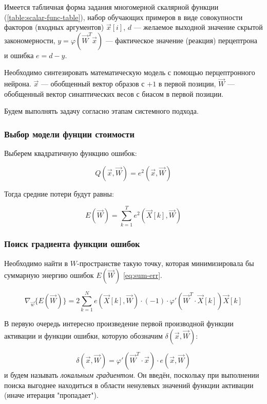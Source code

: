 \documentclass{article}
\numberwithin{equation}{subsection}
\begin{document}
Имеется табличная форма задания многомерной скалярной функции (\ref{table:scalar-func-table}), 
набор обучающих примеров в виде совокупности факторов (входных аргументов) $\vec{x}[i]$, $d$ ---
желаемое выходной значение скрытой закономерности, $y = \varphi (\vec{W}^T \vec{x})$ ---
фактическое значение (реакция) перцептрона и ошибка $e = d - y$.

Необходимо синтезировать математическую модель с помощью перцептронного нейрона. 
$\vec{x}$ --- обобщенный вектор образов с $+1$ в первой позиции, $\vec{W}$ ---
обобщенный вектор синаптических весов с биасом в первой позиции.

Будем выполнять задачу согласно этапам системного подхода.



\subsubsection{Выбор модели фунции стоимости}

Выберем квадратичную функцию ошибок:

\begin{equation}
    Q(\vec{x}, \vec{W}) = e^2(\vec{x}, \vec{W})
\end{equation}

Тогда средние потери будут равны:
    
\begin{equation}
    E(\vec{W}) = \sum_{k=1}^{T} e^2 (\vec{X}[k], \vec{W})
    \label{eq:sum-err}
\end{equation}



\subsubsection{Поиск градиента функции ошибок}

Необходимо найти в $W$-пространстве такую точку, которая минимизировала бы суммарную 
энергию ошибок $E(\vec{W})$ \ref{eq:sum-err}.

\begin{equation}
    \nabla_{\vec{w}} \{ E(\vec{W}) \} = 2 \sum_{k=1}^{N} e (\vec{X}[k], \vec{W}) \cdot (-1)
    \cdot \varphi ' (\vec{W}^T \cdot \vec{X}[k]) \vec{X}[k]
\end{equation}

В первую очередь интересно произведение первой производной функции активации и функции ошибки, 
которую обозначим $\delta(\vec{x}, \vec{W})$:

\begin{equation}
    \delta(\vec{x}, \vec{W}) = \varphi ' (\vec{W}^{T} \cdot \vec{x}) \cdot e(\vec{x}, \vec{W})
\end{equation}
\noindent
и будем называть \textit{локальным градиентом}. 
Он введён, поскольку при выполнении поиска выгоднее находиться в области ненулевых значений
функции активации (иначе итерация "пропадает").
\end{document}
